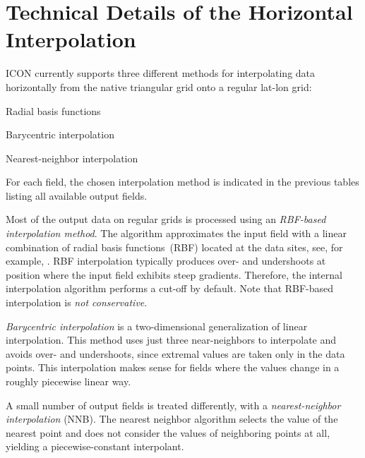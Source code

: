 \section{Technical Details of the Horizontal Interpolation}
\label{section:technical_details_of_the_horizontal_interpolation}
ICON currently supports three different methods for interpolating data horizontally  
from the native triangular grid onto a regular lat-lon grid:
\begin{description}[leftmargin=3.0cm,style=sameline]
 \item [RBF] Radial basis functions
 \item [BCT] Barycentric interpolation
 \item [NNB] Nearest-neighbor interpolation
\end{description}
For each field, the chosen interpolation method is indicated in the previous tables 
listing all available output fields.

Most of the output data on regular grids is processed using an \emph{RBF-based interpolation method}.
The algorithm  approximates the input field with a linear combination of 
radial basis functions~(RBF) located at the data sites, see, for example, \cite{Ruppert2007}.
RBF interpolation typically produces over- and undershoots at position where the input field
exhibits steep gradients.
Therefore, the internal interpolation algorithm performs a cut-off by default.
Note that RBF-based interpolation is \emph{not conservative}.

\emph{Barycentric interpolation} is a two-dimensional generalization of
linear interpolation.
This method uses just three near-neighbors to interpolate and
avoids over- and undershoots, since extremal values are taken
only in the data points.
This interpolation makes sense for fields where the values change  
in a roughly piecewise linear way.

A small number of output fields is treated differently, with a \emph{nearest-neighbor interpolation} 
(NNB). The nearest neighbor algorithm selects the value of the nearest point and does not consider 
the values of neighboring points at all, yielding a piecewise-constant interpolant. 


